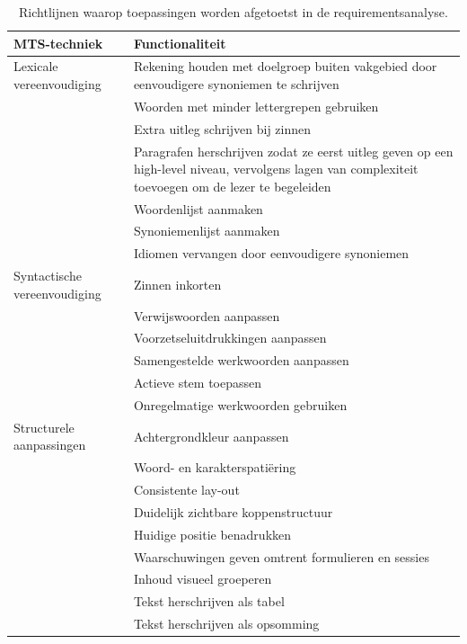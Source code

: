 \begin{center}
	\begin{table}[H]
		\begin{tabular}{ | m{4cm} | m{11cm} | } 
			\hline
			\textbf{MTS-techniek} & \textbf{Functionaliteit} \\
			\hline
			Lexicale vereenvoudiging & Rekening houden met doelgroep buiten vakgebied door eenvoudigere synoniemen te schrijven \\
			& Woorden met minder lettergrepen gebruiken \\
			& Extra uitleg schrijven bij zinnen \\
			& Paragrafen herschrijven zodat ze eerst uitleg geven op een high-level niveau, vervolgens lagen van complexiteit toevoegen om de lezer te begeleiden \\
			& Woordenlijst aanmaken \\
			& Synoniemenlijst aanmaken \\
			& Idiomen vervangen door eenvoudigere synoniemen \\
			\hline
			Syntactische vereenvoudiging & Zinnen inkorten \\
			& Verwijswoorden aanpassen \\
			& Voorzetseluitdrukkingen aanpassen \\
			& Samengestelde werkwoorden aanpassen \\
			& Actieve stem toepassen \\
			& Onregelmatige werkwoorden gebruiken \\
			\hline
			Structurele aanpassingen & Achtergrondkleur aanpassen \\
			& Woord- en karakterspatiëring \\
			& Consistente lay-out \\
			& Duidelijk zichtbare koppenstructuur \\
			& Huidige positie benadrukken \\
			& Waarschuwingen geven omtrent formulieren en sessies \\
			& Inhoud visueel groeperen \\
			& Tekst herschrijven als tabel \\
			& Tekst herschrijven als opsomming \\
			\hline
		\end{tabular}
		\caption{Richtlijnen waarop toepassingen worden afgetoetst in de requirementsanalyse.}
		\label{table:criteria-requirementsanalysis}	
	\end{table}
\end{center}

